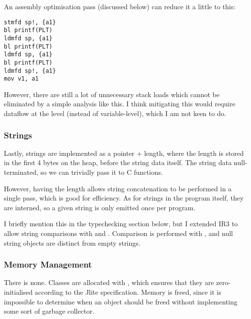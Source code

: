 \documentclass[12pt]{article}
\begin{document}
An assembly optimisation pass (discussed below) can reduce it a little to this:


\begin{verbatim}
stmfd sp!, {a1}
bl printf(PLT)
ldmfd sp, {a1}
bl printf(PLT)
ldmfd sp, {a1}
bl printf(PLT)
ldmfd sp!, {a1}
mov v1, a1
\end{verbatim}

However, there are still a lot of unnecessary stack loads which cannot be eliminated by a simple analysis like this.
I think mitigating this would require dataflow at the  level (instead of variable-level), which
I am not keen to do.








\subsubsection{Strings}

Lastly, strings are implemented as a pointer + length, where the length is stored in the first 4 bytes on the heap,
before the string data itself. The string data  null-terminated, so we can trivially pass it to C functions.

However, having the length allows string concatenation to be performed in a single pass, which is good for efficiency.
As for strings in the program itself, they are interned, so a given string is only emitted once per program.

I briefly mention this in the typechecking section below, but I extended IR3 to allow string comparisons with \eqtt{==}
and \eqtt{!=}. Comparison is performed with , and null string objects are distinct from empty strings.




\subsubsection{Memory Management}

There is none. Classes are allocated with , which ensures that they are zero-initialised according to the
Jlite specification. Memory is  freed, since it is impossible to determine when an object should be freed
without implementing some sort of garbage collector.
\end{document}
